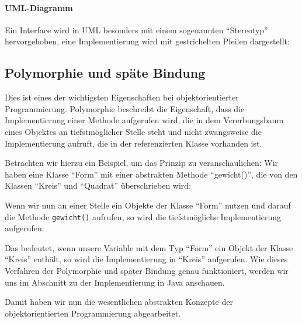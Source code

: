 	\paragraph{UML-Diagramm}
		Ein Interface wird in UML besonders mit einem sogenannten \enquote{Stereotyp} hervorgehoben, eine Implementierung wird mit gestrichelten Pfeilen dargestellt:
		\begin{figure}[H]
			\centering
		\end{figure}

\subsection{Polymorphie und späte Bindung} \imperativeMark \oopMark

	Dies ist eines der wichtigsten Eigenschaften bei objektorientierter Programmierung. Polymorphie beschreibt die Eigenschaft, dass die Implementierung einer Methode aufgerufen wird, die in dem Vererbungsbaum eines Objektes an tiefstmöglicher Stelle steht und nicht zwangsweise die Implementierung aufruft, die in der referenzierten Klasse vorhanden ist.
	
	Betrachten wir hierzu ein Beispiel, um das Prinzip zu veranschaulichen: Wir haben eine Klasse \enquote{Form} mit einer abstrakten Methode \enquote{gewicht()}, die von den Klassen \enquote{Kreis} und \enquote{Quadrat} überschrieben wird:
	\begin{figure}[H]
		\centering
	\end{figure}
	Wenn wir nun an einer Stelle ein Objekte der Klasse \enquote{Form} nutzen und darauf die Methode \texttt{gewicht()} aufrufen, so wird die tiefstmögliche Implementierung aufgerufen.
	
	Das bedeutet, wenn unsere Variable mit dem Typ \enquote{Form} ein Objekt der Klasse \enquote{Kreis} enthält, so wird die Implementierung in \enquote{Kreis} aufgerufen. Wie dieses Verfahren der Polymorphie und später Bindung genau funktioniert, werden wir uns im Abschnitt  zu der Implementierung in Java anschauen.
	
	Damit haben wir nun die wesentlichen abstrakten Konzepte der objektorientierten Programmierung abgearbeitet.
